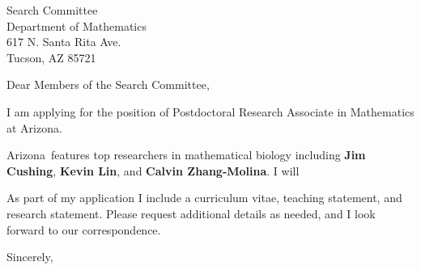 \documentclass[11pt,a4paper]{letter}
\begin{document}

\def\School{Arizona}

\begin{letter}
{Search Committee\\
Department of Mathematics\\
617 N. Santa Rita Ave.\\
Tucson, AZ 85721
}


\opening{Dear Members of the Search Committee,}

I am applying for the position of Postdoctoral Research Associate in Mathematics at \School. 



\School~features top researchers in mathematical biology including \textbf{Jim Cushing}, \textbf{Kevin Lin}, and \textbf{Calvin Zhang-Molina}. I will 



As part of my application I include a curriculum vitae, teaching statement, and research statement. Please request additional details as needed, and I look forward to our correspondence.

\closing{Sincerely,}
\end{letter}
\end{document}

